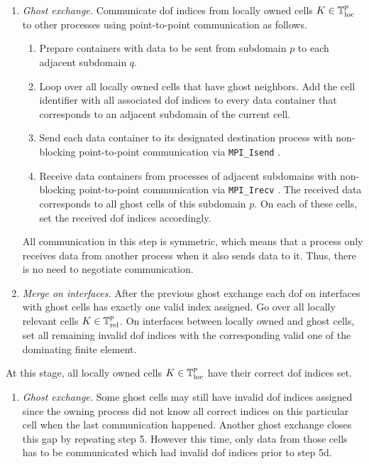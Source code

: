 \begin{enumerate}[resume]
  \item \textit{Ghost exchange.}
  Communicate \gls{dof} indices from locally owned cells $K \in \mathbb{T}^p_{\text{loc}}$ to other processes using point-to-point communication as follows.
  \begin{enumerate}[label=\alph*.]
    \item Prepare containers with data to be sent from subdomain $p$ to each adjacent subdomain $q$.
    \item Loop over all locally owned cells that have ghost neighbors. Add the cell identifier with all associated \gls{dof} indices to every data container that corresponds to an adjacent subdomain of the current cell.
    \item Send each data container to its designated destination process with non-blocking point-to-point communication via \texttt{MPI\_Isend} \textcite{mpi31}.
    \item Receive data containers from processes of adjacent subdomains with non-blocking point-to-point communication via \texttt{MPI\_Irecv} \textcite{mpi31}. The received data corresponds to all ghost cells of this subdomain $p$. On each of these cells, set the received \gls{dof} indices accordingly.
  \end{enumerate}
  All communication in this step is symmetric, which means that a process only receives data from another process when it also sends data to it. Thus, there is no need to negotiate communication.
  \item \textit{Merge on interfaces.}
  After the previous ghost exchange each \gls{dof} on interfaces with ghost cells has exactly one valid index assigned. Go over all locally relevant cells $K \in \mathbb{T}^p_{\text{rel}}$. On interfaces between locally owned and ghost cells, set all remaining invalid \gls{dof} indices with the corresponding valid one of the dominating finite element.
\end{enumerate}
At this stage, all locally owned cells $K \in \mathbb{T}^p_{\text{loc}}$ have their correct \gls{dof} indices set.
\begin{enumerate}[resume]
  \item \textit{Ghost exchange.}
  Some ghost cells may still have invalid \gls{dof} indices assigned since the owning process did not know all correct indices on this particular cell when the last communication happened. Another ghost exchange closes this gap by repeating step 5. However this time, only data from those cells has to be communicated which had invalid \gls{dof} indices prior to step 5d.
\end{enumerate}
